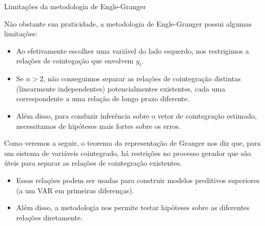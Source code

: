 \documentclass[11pt]{beamer}
\newenvironment{wideitemize}{\itemize\addtolength{\itemsep}{10pt}}{\enditemize}
\begin{document}
\begin{frame}{Limitações da metodologia de Engle-Granger}
	\begin{wideitemize}
		\item Não obstante sua praticidade, a metodologia de Engle-Granger possui algumas limitações:
		\begin{itemize}
			\item Ao efetivamente escolher uma variável do lado esquerdo, nos restrigimos a relações de cointegação que envolvem $y_t$.
			\item Se $n>2$, não conseguimos separar as relações de cointegração distintas (linearmente independentes) potencialmentes existentes, cada uma correspondente a uma relação de longo prazo diferente.
			\item Além disso, para conduzir inferência sobre o vetor de cointegração estimado, necessitamos de hipóteses mais fortes sobre os erros.
		\end{itemize}
		\item Como veremos a seguir, o {\color{blue}teorema da representação de Granger} nos diz que, para um sistema de variáveis cointegrado, há restrições no processo gerador que são úteis para separar as relações de cointegração existentes.
		\begin{itemize}
			\item Essas relações podem ser usadas para construir modelos preditivos superiores (a um VAR em primeiras diferenças).
			\item Além disso, a metodologia nos permite testar hipóteses sobre as diferentes relações diretamente.
		\end{itemize}
	\end{wideitemize}
\end{frame}
\end{document}
